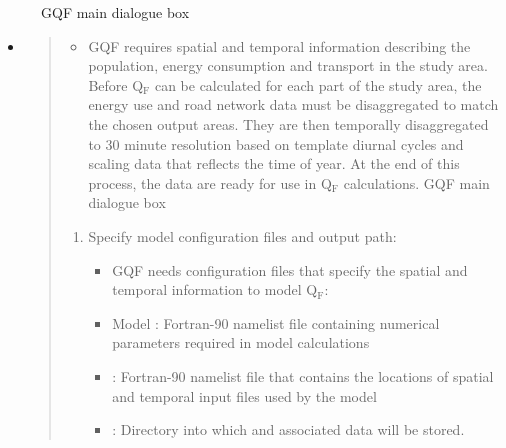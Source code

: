 \documentclass[letterpaper,10pt,english]{sphinxmanual}
\begin{document}
\begin{figure}[htbp]
\centering
\capstart

\noindent{}
\caption{GQF main dialogue box}\label{\detokenize{OtherManuals/GQF_Manual:id4}}\end{figure}
\begin{itemize}
\item {} 
\begin{quote}
\begin{itemize}
\item {} 
GQF requires spatial and temporal information describing the population, energy consumption and transport in the study area. Before Q$_{\text{F}}$ can be calculated for each part of the study area, the energy use and road network data must be disaggregated to match the chosen output areas. They are then temporally disaggregated to 30 minute resolution based on template diurnal cycles and scaling data that reflects the time of year. At the end of this process, the data are ready for use in Q$_{\text{F}}$ calculations.    GQF main dialogue box

\end{itemize}
\begin{enumerate}
\item {} 
Specify model configuration files and output path:
\begin{itemize}
\item {} 
GQF needs configuration files that specify the spatial and temporal information to model Q$_{\text{F}}$:

\item {} 
Model {\hyperref[\detokenize{OtherManuals/GQF_Manual:id3}]{}}: Fortran-90 namelist file containing numerical parameters required in model calculations

\item {} 
{\hyperref[\detokenize{OtherManuals/GQF_Manual:data-sources-file}]{}}: Fortran-90 namelist file that contains the locations of spatial and temporal input files used by the model

\item {} 
: Directory into which {\hyperref[\detokenize{OtherManuals/GQF_Manual:model-outputs}]{}} and associated data will be stored. 

\end{itemize}


\end{enumerate}
\end{quote}
\end{itemize}
\end{document}
